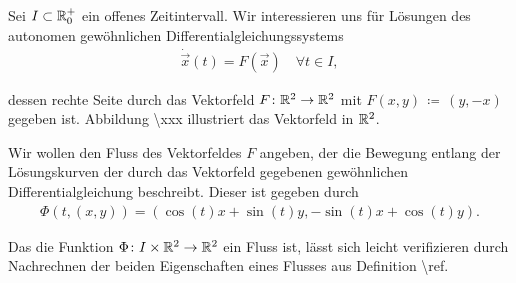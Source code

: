 \begin{example}{}{}



\par
Sei \(I\subset \mathbb{R}_0^+\) ein offenes Zeitintervall.
Wir interessieren uns für Lösungen des autonomen gewöhnlichen Differentialgleichungssystems
\begin{align*}
\dot{\vec{x}}(t) = F(\vec{x}) \quad \forall t\in I,
\end{align*}
\par
dessen rechte Seite durch das Vektorfeld \(F \colon \mathbb{R}^2 \rightarrow \mathbb{R}^2\) mit \(F(x,y) \, \coloneqq \, (y, -x)\) gegeben ist.
Abbildung \textbackslash{}xxx illustriert das Vektorfeld in \(\mathbb{R}^2\).

\par
Wir wollen den Fluss des Vektorfeldes \(F\) angeben, der die Bewegung entlang der Lösungskurven der durch das Vektorfeld gegebenen gewöhnlichen Differentialgleichung beschreibt.
Dieser ist gegeben durch
\begin{align*}
\Phi(t,(x,y)) = (\cos(t)x + \sin(t)y, -\sin(t)x + \cos(t)y).
\end{align*}
\par
Das die Funktion \(\Phi \colon I \times \mathbb{R}^2 \rightarrow \mathbb{R}^2\) ein Fluss ist, lässt sich leicht verifizieren durch Nachrechnen der beiden Eigenschaften eines Flusses aus Definition \textbackslash{}ref.


\end{example}
